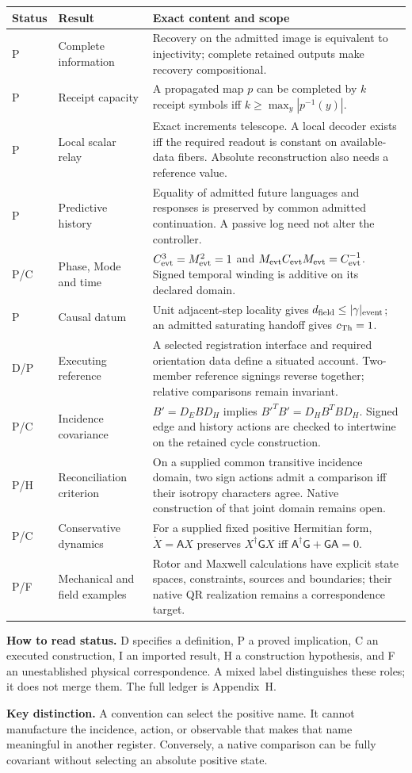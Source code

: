 \noindent\begin{tabularx}{\textwidth}{@{}p{}p{}X@{}}
\toprule
Status & Result & Exact content and scope \\
\midrule
P & Complete information & Recovery on the admitted image is equivalent to injectivity; complete retained outputs make recovery compositional. \\
P & Receipt capacity & A propagated map $p$ can be completed by $k$ receipt symbols iff $k\geq\max_y|p^{-1}(y)|$. \\
P & Local scalar relay & Exact increments telescope. A local decoder exists iff the required readout is constant on available-data fibers. Absolute reconstruction also needs a reference value. \\
P & Predictive history & Equality of admitted future languages and responses is preserved by common admitted continuation. A passive log need not alter the controller. \\
P/C & Phase, Mode and time & $C_{\rm evt}^3=M_{\rm evt}^2=1$ and $M_{\rm evt}C_{\rm evt}M_{\rm evt}=C_{\rm evt}^{-1}$. Signed temporal winding is additive on its declared domain. \\
P & Causal datum & Unit adjacent-step locality gives $d_{\rm field}\leq|\gamma|_{\rm event}$; an admitted saturating handoff gives $c_{\rm Th}=1$. \\
D/P & Executing reference & A selected registration interface and required orientation data define a situated account. Two-member reference signings reverse together; relative comparisons remain invariant. \\
P/C & Incidence covariance & $B'=D_EBD_H$ implies $B'^TB'=D_HB^TBD_H$. Signed edge and history actions are checked to intertwine on the retained cycle construction. \\
P/H & Reconciliation criterion & On a supplied common transitive incidence domain, two sign actions admit a comparison iff their isotropy characters agree. Native construction of that joint domain remains open. \\
P/C & Conservative dynamics & For a supplied fixed positive Hermitian form, $\dot X=\mathsf A X$ preserves $X^\dagger\mathsf G X$ iff $\mathsf A^\dagger\mathsf G+\mathsf G\mathsf A=0$. \\
P/F & Mechanical and field examples & Rotor and Maxwell calculations have explicit state spaces, constraints, sources and boundaries; their native QR realization remains a correspondence target. \\
\bottomrule
\end{tabularx}
\normalsize

\medskip
\noindent\textbf{How to read status.} D specifies a definition, P a proved implication, C an executed construction, I an imported result, H a construction hypothesis, and F an unestablished physical correspondence. A mixed label distinguishes these roles; it does not merge them. The full ledger is Appendix~H.

\medskip
\noindent\textbf{Key distinction.} A convention can select the positive name. It cannot manufacture the incidence, action, or observable that makes that name meaningful in another register. Conversely, a native comparison can be fully covariant without selecting an absolute positive state.
